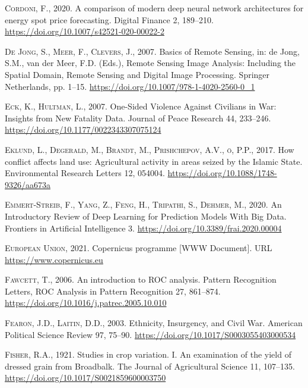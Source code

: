 \documentclass[a4paper,11pt]{article}
\begin{document}
\leavevmode\hypertarget{ref-cordoni2020}{}%
\textsc{Cordoni, F.}, 2020. A comparison of modern deep neural network architectures for energy spot price forecasting. Digital Finance 2, 189--210. \url{https://doi.org/10.1007/s42521-020-00022-2}

\leavevmode\hypertarget{ref-dejong2007}{}%
\textsc{De Jong, S., Meer, F., Clevers, J.}, 2007. Basics of Remote Sensing, in: de Jong, S.M., van der Meer, F.D. (Eds.), Remote Sensing Image Analysis: Including the Spatial Domain, Remote Sensing and Digital Image Processing. Springer Netherlands, pp. 1--15. \url{https://doi.org/10.1007/978-1-4020-2560-0_1}

\leavevmode\hypertarget{ref-eck2007}{}%
\textsc{Eck, K., Hultman, L.}, 2007. One-Sided Violence Against Civilians in War: Insights from New Fatality Data. Journal of Peace Research 44, 233--246. \url{https://doi.org/10.1177/0022343307075124}

\leavevmode\hypertarget{ref-eklund2017}{}%
\textsc{Eklund, L., Degerald, M., Brandt, M., Prishchepov, A.V., ö, P.P.}, 2017. How conflict affects land use: Agricultural activity in areas seized by the Islamic State. Environmental Research Letters 12, 054004. \url{https://doi.org/10.1088/1748-9326/aa673a}

\leavevmode\hypertarget{ref-emmert2020}{}%
\textsc{Emmert-Streib, F., Yang, Z., Feng, H., Tripathi, S., Dehmer, M.}, 2020. An Introductory Review of Deep Learning for Prediction Models With Big Data. Frontiers in Artificial Intelligence 3. \url{https://doi.org/10.3389/frai.2020.00004}

\leavevmode\hypertarget{ref-europeanunion2021}{}%
\textsc{European Union}, 2021. Copernicus programme {[}WWW Document{]}. URL \url{https://www.copernicus.eu}

\leavevmode\hypertarget{ref-fawcett2006}{}%
\textsc{Fawcett, T.}, 2006. An introduction to ROC analysis. Pattern Recognition Letters, ROC Analysis in Pattern Recognition 27, 861--874. \url{https://doi.org/10.1016/j.patrec.2005.10.010}

\leavevmode\hypertarget{ref-fearon2003}{}%
\textsc{Fearon, J.D., Laitin, D.D.}, 2003. Ethnicity, Insurgency, and Civil War. American Political Science Review 97, 75--90. \url{https://doi.org/10.1017/S0003055403000534}

\leavevmode\hypertarget{ref-fisher1921}{}%
\textsc{Fisher, R.A.}, 1921. Studies in crop variation. I. An examination of the yield of dressed grain from Broadbalk. The Journal of Agricultural Science 11, 107--135. \url{https://doi.org/10.1017/S0021859600003750}
\end{document}
